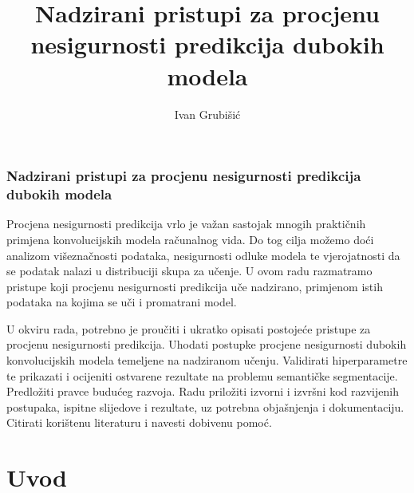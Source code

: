 \documentclass[utf8, diplomski, lmodern]{fer}
\begin{document}
\title{Nadzirani pristupi za procjenu nesigurnosti predikcija dubokih modela}
\author{Ivan Grubišić}
\maketitle

\izvornik
\subsection*{Nadzirani pristupi za procjenu nesigurnosti predikcija dubokih modela}

Procjena nesigurnosti predikcija vrlo je važan sastojak mnogih praktičnih primjena konvolucijskih modela računalnog vida. Do tog cilja možemo doći analizom višeznačnosti podataka, nesigurnosti odluke modela te vjerojatnosti da se podatak nalazi u distribuciji skupa za učenje. U ovom radu razmatramo pristupe koji procjenu nesigurnosti predikcija uče nadzirano, primjenom istih podataka na kojima se uči i promatrani model.

U okviru rada, potrebno je proučiti i ukratko opisati postojeće pristupe za procjenu nesigurnosti predikcija. Uhodati postupke procjene nesigurnosti dubokih konvolucijskih modela temeljene na nadziranom učenju. Validirati hiperparametre te prikazati i ocijeniti ostvarene rezultate na problemu semantičke segmentacije. Predložiti pravce budućeg razvoja.
Radu priložiti izvorni i izvršni kod razvijenih postupaka, ispitne slijedove i rezultate, uz potrebna objašnjenja i dokumentaciju. Citirati korištenu literaturu i navesti dobivenu pomoć.



\tableofcontents

\newpage

\begingroup
\onehalfspacing
\printunsrtglossary[type=symbols,style=supergroup,title={Oznake}]
\endgroup



\chapter{Uvod}
\end{document}
